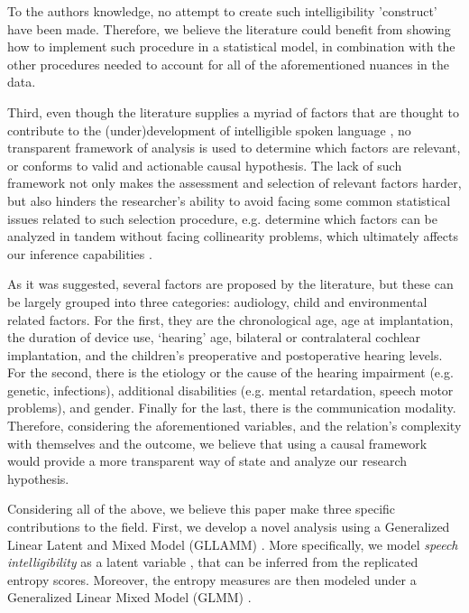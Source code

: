To the authors knowledge, no attempt to create such intelligibility 'construct' have been made. Therefore, we believe the literature could benefit from showing how to implement such procedure in a statistical model, in combination with the other procedures needed to account for all of the aforementioned nuances in the data.

Third, even though the literature supplies a myriad of factors that are thought to contribute to the (under)development of intelligible spoken language \cite{Boons_et_al_2012, Gillis_2018, Fagan_et_al_2020, Niparko_et_al_2010}, no transparent framework of analysis is used to determine which factors are relevant, or conforms to valid and actionable causal hypothesis. The lack of such framework not only makes the assessment and selection of relevant factors harder, but also hinders the researcher's ability to avoid facing some common statistical issues related to such selection procedure, e.g. determine which factors can be analyzed in tandem without facing collinearity problems, which ultimately affects our inference capabilities \cite{Farrar_et_al_1967}.

As it was suggested, several factors are proposed by the literature, but these can be largely grouped into three categories: audiology, child and environmental related factors. For the first, they are the chronological age, age at implantation, the duration of device use, `hearing' age, bilateral or contralateral cochlear implantation, and the children's preoperative and postoperative hearing levels. For the second, there is the etiology or the cause of the hearing impairment (e.g. genetic, infections), additional disabilities (e.g. mental retardation, speech motor problems), and gender. Finally for the last, there is the communication modality. Therefore, considering the aforementioned variables, and the relation's complexity with themselves and the outcome, we believe that using a causal framework would provide a more transparent way of state and analyze our research hypothesis.

Considering all of the above, we believe this paper make three specific contributions to the field. First, we develop a novel analysis using a Generalized Linear Latent and Mixed Model (GLLAMM) \cite{Rabe_et_al_2004a, Rabe_et_al_2004b, Rabe_et_al_2004c, Rabe_et_al_2012, Skrondal_et_al_2004a}. More specifically, we model \textit{speech intelligibility} as a latent variable \cite{Everitt_1984}, that can be inferred from the replicated entropy scores. Moreover, the entropy measures are then modeled under a Generalized Linear Mixed Model (GLMM) \cite{Breslow_et_al_1993, Nelder_et_al_1996, Nelder_et_al_1983}. 

